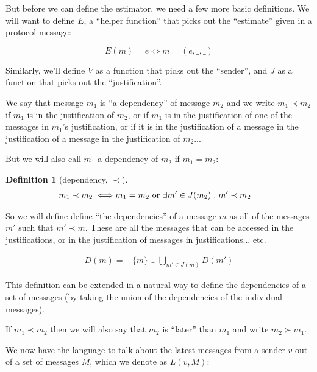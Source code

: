 \documentclass{article}
\theoremstyle{definition}
\newtheorem{defn}{Definition}[section]
\begin{document}
But before we can define the estimator, we need a few more basic definitions. We will want to define $E$, a ``helper function'' that picks out the ``estimate'' given in a protocol message:

$$
E(m) = e \iff m = (e, \_, \_)
$$

Similarly, we'll define $V$ as a function that picks out the ``sender'', and $J$ as a function that picks out the ``justification''.  

We say that message $m_1$ is ``a dependency'' of message $m_2$ and we write $m_1 \prec m_2$ if $m_1$ is in the justification of $m_2$, or if $m_1$ is in the justification of one of the messages in $m_1$'s justification, or if it is in the justification of a message in the justification of a message in the justification of $m_2$...

But we will also call $m_1$ a dependency of $m_2$ if $m_1 = m_2$:

\begin{defn}[dependency, $\prec$]
\begin{equation*}
\begin{split}
m_1 \prec m_2 \iff & m_1 = m_2 \text{ or } \exists m' \in J(m_2) \hspace{1mm} . \hspace{1mm} m' \prec m_2
\end{split}
\end{equation*}
\end{defn}

So we will define define ``the dependencies'' of a message $m$ as all of the messages $m'$ such that $m' \prec m$. These are all the messages that can be accessed in the justifications, or in the justification of messages in justifications... etc.

\begin{equation*}
\begin{split}
D(m) = &\{m\}\cup \bigcup_{m' \in J(m)} D(m') 
\end{split}
\end{equation*}

This definition can be extended in a natural way to define the dependencies of a set of messages (by taking the union of the dependencies of the individual messages).

If $m_1 \prec m_2$ then we will also say that $m_2$ is ``later'' than $m_1$ and write $m_2 \succ m_1$.

We now have the language to talk about the latest messages from a sender $v$ out of a set of messages $M$, which we denote as $L(v, M)$:
\end{document}
